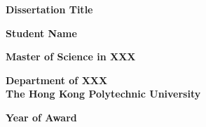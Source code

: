 \thispagestyle{empty}
\begin{center}
\Large

\textbf{Dissertation Title}

\vspace{2.0in}

\textbf{Student Name}

\vspace{1.5in}

\textbf{Master of Science in XXX}

\vspace{0.5in}

\textbf{Department of XXX}\\
\textbf{The Hong Kong Polytechnic University}


\textbf{Year of Award}

\end{center}